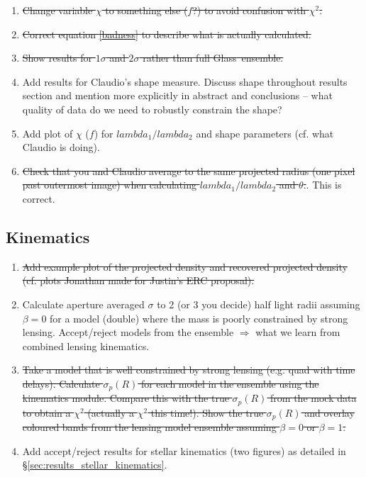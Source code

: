 \documentclass[galley,usenatbib]{mn2e}
\newcommand{\Glass}{{\sc Glass}}
\begin{document}
\begin{enumerate}

  \item \sout{Change variable $\chi$ to something else ($f$?) to avoid confusion with $\chi^2$.}

  \item \sout{Correct equation \eqref{badness} to describe what is actually calculated.}

  \item \sout{Show results for $1\sigma$ and $2\sigma$ rather than full \Glass\ ensemble.}

\item Add results for Claudio's shape measure. Discuss shape
  throughout results section and mention more explicitly in abstract
  and conclusions -- what quality of data do we need to robustly
  constrain the shape?

\item Add plot of $\chi$ ($f$) for $lambda_1/lambda_2$ and shape
  parameters (cf. what Claudio is doing).

\item \sout{Check that you and Claudio average to the same projected radius
  (one pixel past outermost image) when calculating
  $lambda_1/lambda_2$ and $\theta$.}. This is correct.

\end{enumerate}

\subsection{Kinematics}

\begin{enumerate}

\item \sout{Add example plot of the projected density and recovered
  projected density (cf. plots Jonathan made for Justin's ERC
proposal).}

\item Calculate aperture averaged $\sigma$ to 2 (or 3 you decide) half
  light radii assuming $\beta = 0$ for a model (double) where the mass
  is poorly constrained by strong lensing. Accept/reject models from
  the ensemble $\Longrightarrow$ what we learn from combined lensing
  kinematics.

\item \sout{Take a model that is well constrained by strong lensing
  (e.g. quad with time delays). Calculate $\sigma_p(R)$ for each model
  in the ensemble using the kinematics module. Compare this with the
true $\sigma_p(R)$ from the mock data to obtain a $\chi^2$ (actually
  a $\chi^2$ this time!). Show the true $\sigma_p(R)$ and overlay
  coloured bands from the lensing model ensemble assuming $\beta = 0$
or $\beta = 1$.}

\item Add accept/reject results for stellar kinematics (two figures)
  as detailed in \S\ref{sec:results_stellar_kinematics}.

\end{enumerate}
\end{document}
